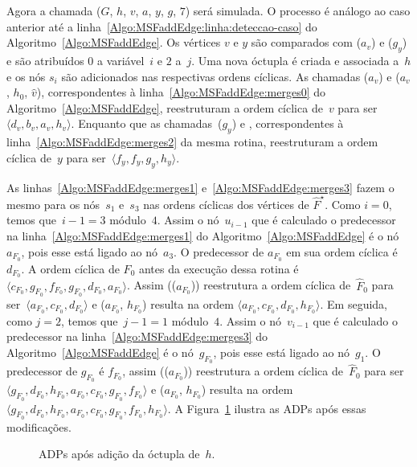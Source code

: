 Agora a chamada \MSFaddEdge($G$, $h$, $v$, $a$, $y$, $g$, $7$) será simulada.
O processo é análogo ao caso anterior até a linha~\ref{Algo:MSFaddEdge:linha:deteccao-caso} do Algoritmo~\ref{Algo:MSFaddEdge}.
Os vértices $v$ e $y$ são comparados com \LCOFindNode($a_v$) e \LCOFindNode($g_y$) e são atribuídos $0$ a variável~$i$ e $2$ a~$j$.
Uma nova óctupla é criada e associada a~$h$ e os nós $s_i$ são adicionados nas respectivas ordens cíclicas.
As chamadas \LCOCycle($a_v$) e \LCOMerge($a_v$, $h_0$, $\hat v$), correspondentes à linha~\ref{Algo:MSFaddEdge:merges0} do Algoritmo~\ref{Algo:MSFaddEdge}, reestruturam a ordem cíclica de~$v$ para ser $\langle d_v, b_v, a_v, h_v \rangle$.
Enquanto que as chamadas~\LCOCycle($g_y$) e , correspondentes à linha~\ref{Algo:MSFaddEdge:merges2} da mesma rotina, reestruturam a ordem cíclica de~$y$ para ser~$\langle f_y, f_y, g_y, h_y \rangle$.


As linhas~\ref{Algo:MSFaddEdge:merges1} e~\ref{Algo:MSFaddEdge:merges3} fazem o mesmo para os nós~$s_1$ e~$s_3$ nas ordens cíclicas dos vértices de $\hat F^\star$.
Como $i=0$, temos que~$i-1 = 3$ módulo~$4$.
Assim o nó~$u_{i-1}$ que é calculado o predecessor na linha~\ref{Algo:MSFaddEdge:merges1} do Algoritmo~\ref{Algo:MSFaddEdge} é o nó~$a_{F_0}$, pois esse está ligado ao nó~$a_3$.
O predecessor de $a_{F_0}$ em sua ordem cíclica é $d_{F_0}$.
A ordem cíclica de $F_0$ antes da execução dessa rotina é $\langle c_{F_0}, g_{F_0}, f_{F_0}, g_{F_0}, d_{F_0}, a_{F_0} \rangle$.
Assim \LCOCycle(\treapPredecessor($a_{F_0}$)) reestrutura a ordem cíclica de~$\hat F_0$ para ser~$\langle a_{F_0}, c_{F_0}, d_{F_0}\rangle$ e \LCOMerge($a_{F_0}$, $h_{F_0}$) resulta na ordem $\langle a_{F_0}, c_{F_0}, d_{F_0}, h_{F_0}\rangle$.
Em seguida, como $j=2$, temos que~$j-1 = 1$ módulo~$4$.
Assim o nó~$v_{i-1}$ que é calculado o predecessor na linha~\ref{Algo:MSFaddEdge:merges3} do Algoritmo~\ref{Algo:MSFaddEdge} é o nó~$g_{F_0}$, pois esse está ligado ao nó~$g_1$.
O predecessor de $g_{F_0}$ é $f_{F_0}$, assim \LCOCycle(\treapPredecessor($a_{F_0}$)) reestrutura a ordem cíclica de~$\hat F_0$ para ser~$\langle g_{F_0}, d_{F_0}, h_{F_0}, a_{F_0}, c_{F_0}, g_{F_0}, f_{F_0}\rangle$ e \LCOMerge($a_{F_0}$, $h_{F_0}$) resulta na ordem~$\langle g_{F_0}, d_{F_0}, h_{F_0}, a_{F_0}, c_{F_0}, g_{F_0}, f_{F_0}, h_{F_0}\rangle$.
A Figura~\ref{fig:MSF-adiciona-nao-ponte-1} ilustra as ADPs após essas modificações.

\begin{figure}[htb]
\scalebox{1}{

}
\caption{ADPs após adição da óctupla de~$h$.}
\label{fig:MSF-adiciona-nao-ponte-1}
\end{figure}

